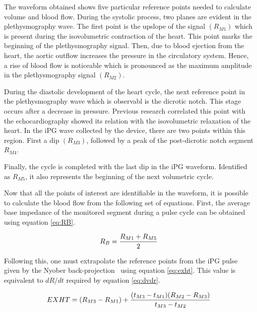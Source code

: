 The waveform obtained shows five particular reference points needed to calculate volume and blood flow. During the systolic process, two planes are evident in the plethysmography wave. The first point is the upslope of the signal $(R_{M1})$ which is present during the isovolumetric contraction of the heart.  This point marks the beginning of the plethysmography signal. Then, due to blood ejection from the heart, the aortic outflow increases the pressure in the circulatory system. Hence, a rise of blood flow is noticeable which is pronounced as the maximum amplitude in the plethysmography signal $(R_{M2})$. 

During the diastolic development of the heart cycle, the next reference point in the plethysmography wave which is observabl is the dicrotic notch. This stage occurs after a decrease in pressure. Previous research correlated this point with the echocardiography showed its relation with the isovolumetric relaxation of the heart. In the iPG wave collected by the device, there are two points within this region. First a dip $(R_{M3})$, followed by a peak of the post-dicrotic notch segment $R_{M4}$. 


Finally, the cycle is completed with the last dip in the iPG waveform. Identified as $R_{M5}$, it also represents the beginning of the next volumetric cycle. 

Now that all the points of interest are identifiable in the waveform, it is possible to calculate the blood flow from the following set of equations. First, the average base impedance of the monitored segment during a pulse cycle can be obtained using equation \ref{eq:RB}.

\begin{align}
	\label{eq:RB}
	R_B = \frac{R_{M1}+R_{M5}}{2} \tagaddtext{[\si{\Omega}]}
\end{align}

Following this, one must extrapolate the reference points from the iPG pulse given by the Nyober back-projection~\cite{montgomery2011segmental} using equation \ref{eq:exht}. This value is equivalent to $dR/dt$ required  by equation \ref{eq:dvdr}.

\begin{align}
	\label{eq:exht}
	EXHT = (R_{M3}-R_{M1}) + \frac{(t_{M3}-t_{M1})(R_{M2}-R_{M3})}{t_{M3}-t_{M2}} \tagaddtext{[\si{\Omega}]}
\end{align}

